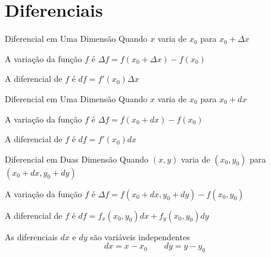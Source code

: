 \documentclass[fleqn,utf8,aspectratio=169,12pt,ignorenonframetext]{beamer}
\begin{document}
\section{Diferenciais}

\begin{frame}{Diferencial em Uma Dimensão}
  Quando $x$ varia de $x_0$ para
  \tabto{55mm}\(x_0+\Delta x\)

  \pause
  \vspace{\baselineskip}
  A variação da função $f$ é
  \tabto{55mm}\(\Delta f = f(x_0 + \Delta x) - f(x_0)\)

  \pause
  \vspace{\baselineskip}
  A diferencial de $f$ é
  \tabto{55mm}\(df = f'(x_0) \Delta x\)
\end{frame}

\begin{frame}{Diferencial em Uma Dimensão}
  Quando $x$ varia de $x_0$ para
  \tabto{55mm}\(x_0+dx\)

  \vspace{\baselineskip}
  A variação da função $f$ é
  \tabto{55mm}\(\Delta f = f(x_0 + dx) - f(x_0)\)

  \vspace{\baselineskip}
  A diferencial de $f$ é
  \tabto{55mm}\(df = f'(x_0) dx\)
\end{frame}

\begin{frame}{Diferencial em Duas Dimensão}
  Quando $(x, y)$ varia de $(x_0, y_0)$ para
  \tabto{65mm}\((x_0+dx, y_0+dy)\)

  \pause
  \vspace{\baselineskip}
  A variação da função $f$ é
  \tabto{65mm}\(\Delta f = f(x_0+dx, y_0+dy) - f(x_0, y_0)\)

  \pause
  \vspace{\baselineskip}
  A diferencial de $f$ é
  \tabto{65mm}\(df = f_x(x_0, y_0) dx +  f_y(x_0, y_0) dy\)

  \pause
  \vspace{\baselineskip}
  As diferenciais $dx$ e $dy$ são variáveis independentes
  \[
    dx = x - x_0
    \qquad
    dy=y-y_0
  \]
\end{frame}
\end{document}
